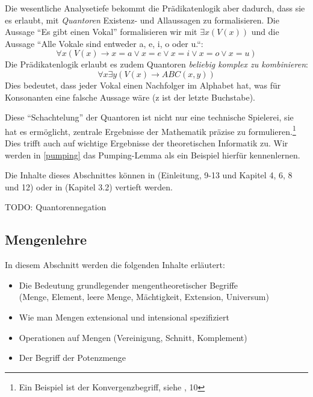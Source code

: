 Die wesentliche Analysetiefe bekommt die Prädikatenlogik aber dadurch,
dass sie es erlaubt, mit \emph{Quantoren} Existenz- und Allaussagen zu formalisieren.
Die Aussage ``Es gibt einen Vokal'' formalisieren wir mit $\exists x(V(x))$
und die Aussage ``Alle Vokale sind entweder a, e, i, o oder u.``:
\[\forall x (V(x) \rightarrow x = a \vee x = e \vee x = i \vee x = o \vee x = u)\]
Die Prädikatenlogik erlaubt es zudem Quantoren \emph{beliebig komplex zu kombinieren}:
\[\forall x \exists y(V(x) \rightarrow ABC(x,y))\]
Dies bedeutet, dass jeder Vokal einen Nachfolger im Alphabet hat,
was für Konsonanten eine falsche Aussage wäre (z ist der letzte Buchstabe).

Diese ``Schachtelung'' der Quantoren ist nicht nur eine technische Spielerei,
sie hat es ermöglicht, zentrale Ergebnisse der Mathematik präzise zu formulieren.\footnote{
    Ein Beispiel ist der Konvergenzbegriff, siehe \cite{link}, 10
}
Dies trifft auch auf wichtige Ergebnisse der theoretischen Informatik zu.
Wir werden in \autoref{pumping} das Pumping-Lemma als ein Beispiel hierfür kennenlernen.

Die Inhalte dieses Abschnittes können in \cite{link}
(Einleitung, 9-13 und Kapitel 4, 6, 8 und 12)
oder in \cite{hoffmann} (Kapitel 3.2)
vertieft werden.

TODO: Quantorennegation

\subsection{Mengenlehre}\label{mengenlehre}
In diesem Abschnitt werden die folgenden Inhalte erläutert:
\begin{itemize}
    \item Die Bedeutung grundlegender mengentheoretischer Begriffe\\
        (Menge, Element, leere Menge, Mächtigkeit, Extension, Universum)
    \item Wie man Mengen extensional und intensional spezifiziert
    \item Operationen auf Mengen (Vereinigung, Schnitt, Komplement)
    \item Der Begriff der Potenzmenge
\end{itemize}
